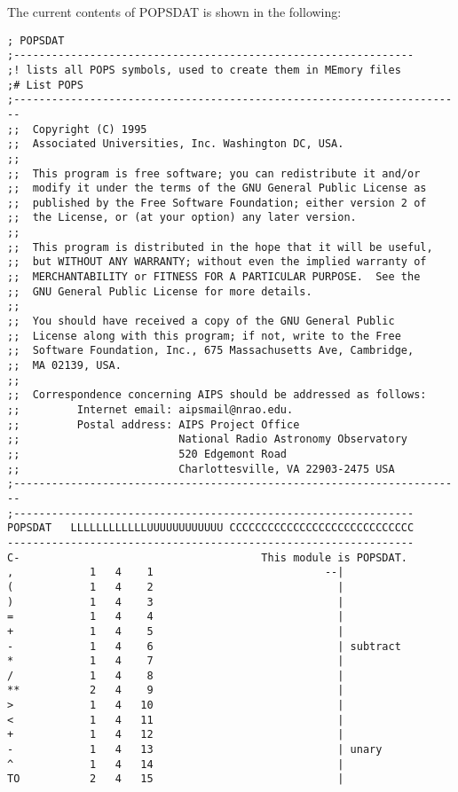 The current contents of POPSDAT is shown in the following:
\begin{verbatim}
; POPSDAT
;---------------------------------------------------------------
;! lists all POPS symbols, used to create them in MEmory files
;# List POPS
;-----------------------------------------------------------------------
;;  Copyright (C) 1995
;;  Associated Universities, Inc. Washington DC, USA.
;;
;;  This program is free software; you can redistribute it and/or
;;  modify it under the terms of the GNU General Public License as
;;  published by the Free Software Foundation; either version 2 of
;;  the License, or (at your option) any later version.
;;
;;  This program is distributed in the hope that it will be useful,
;;  but WITHOUT ANY WARRANTY; without even the implied warranty of
;;  MERCHANTABILITY or FITNESS FOR A PARTICULAR PURPOSE.  See the
;;  GNU General Public License for more details.
;;
;;  You should have received a copy of the GNU General Public
;;  License along with this program; if not, write to the Free
;;  Software Foundation, Inc., 675 Massachusetts Ave, Cambridge,
;;  MA 02139, USA.
;;
;;  Correspondence concerning AIPS should be addressed as follows:
;;         Internet email: aipsmail@nrao.edu.
;;         Postal address: AIPS Project Office
;;                         National Radio Astronomy Observatory
;;                         520 Edgemont Road
;;                         Charlottesville, VA 22903-2475 USA
;-----------------------------------------------------------------------
;---------------------------------------------------------------
POPSDAT   LLLLLLLLLLLLUUUUUUUUUUUU CCCCCCCCCCCCCCCCCCCCCCCCCCCCC
----------------------------------------------------------------
C-                                      This module is POPSDAT.
,            1   4    1                           --|
(            1   4    2                             |
)            1   4    3                             |
=            1   4    4                             |
+            1   4    5                             |
-            1   4    6                             | subtract
*            1   4    7                             |
/            1   4    8                             |
**           2   4    9                             |
>            1   4   10                             |
<            1   4   11                             |
+            1   4   12                             |
-            1   4   13                             | unary
^            1   4   14                             |
TO           2   4   15                             |

\end{verbatim}
